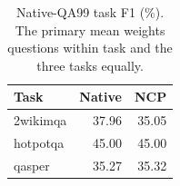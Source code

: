 \begin{table}[ht]
\centering\small
\caption{Native-QA99 task F1 (\%). The primary mean weights questions within task and the three tasks equally.}
\label{tab:native-qa-tasks}
\begin{tabular}{@{}lrr@{}}
\toprule
Task & Native & NCP \\
\midrule
2wikimqa & 37.96 & 35.05 \\
hotpotqa & 45.00 & 45.00 \\
qasper & 35.27 & 35.32 \\
\bottomrule
\end{tabular}
\end{table}
